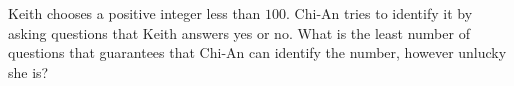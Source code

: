 Keith chooses a positive integer less than $100$. Chi-An tries to identify it by asking questions that Keith answers yes or no. What is the least number of questions that guarantees that Chi-An can identify the number, however unlucky she is?
